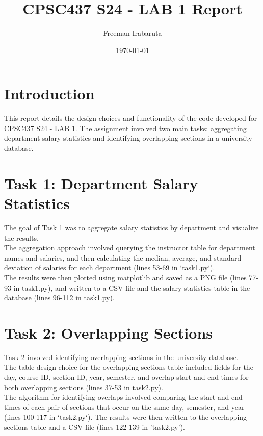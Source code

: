 \documentclass{article}
\begin{document}
\title{CPSC437 S24 - LAB 1 Report}
\author{Freeman Irabaruta}
\date{\today}
\maketitle

\section{Introduction}
This report details the design choices and functionality of the code developed for CPSC437 S24 - LAB 1. The assignment involved two main tasks: aggregating department salary statistics and identifying overlapping sections in a university database.

\section{Task 1: Department Salary Statistics}
The goal of Task 1 was to aggregate salary statistics by department and visualize the results.  \\
The aggregation approach involved querying the instructor table for department names and salaries, and then calculating the median, average, and standard deviation of salaries for each department (lines 53-69 in `task1.py`). \\
The results were then plotted using matplotlib and saved as a PNG file (lines 77-93 in task1.py), and written to a CSV file and the salary statistics table in the database (lines 96-112 in task1.py). \\

\section{Task 2: Overlapping Sections}
Task 2 involved identifying overlapping sections in the university database. \\
The table design choice for the overlapping sections table included fields for the day, course ID, section ID, year, semester, and overlap start and end times for both overlapping sections (lines 37-53 in task2.py). \\
The algorithm for identifying overlaps involved comparing the start and end times of each pair of sections that occur on the same day, semester, and year (lines 100-117 in `task2.py`).
The results were then written to the overlapping sections table and a CSV file (lines 122-139 in 'task2.py').
\end{document}
